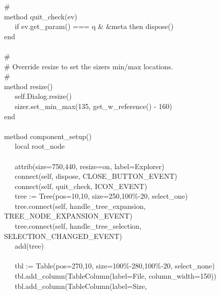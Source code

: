{\>   \# \\
\>   method quit\_check(ev) \\
\>   \ \ \ if ev.get\_param() === {\textquotedbl}q{\textquotedbl} \&
\&meta then dispose() \\
\>   end \\
\ \\
\>   \# \\
\>   \# Override resize to set the sizer{\textquotesingle}s min/max
locations. \\
\>   \# \\
\>   method resize() \\
\>   \ \ \ self.Dialog.resize() \\
\>   \ \ \ sizer.set\_min\_max(135, get\_w\_reference() - 160) \\
\>   end \\
\ \\
\>   method component\_setup() \\
\>   \ \ \ local root\_node \\
\ \\
\>   \ \ \ attrib({\textquotedbl}size=750,440{\textquotedbl},
{\textquotedbl}resize=on{\textquotedbl},
{\textquotedbl}label=Explorer{\textquotedbl}) \\
\>   \ \ \ connect(self, {\textquotedbl}dispose{\textquotedbl},
CLOSE\_BUTTON\_EVENT) \\
\>   \ \ \ connect(self, {\textquotedbl}quit\_check{\textquotedbl},
ICON\_EVENT) \\
\>   \ \ \ tree := Tree({\textquotedbl}pos=10,10{\textquotedbl},
{\textquotedbl}size=250,100\%-20{\textquotedbl},
{\textquotedbl}select\_one{\textquotedbl}) \\
\>   \ \ \ tree.connect(self,
{\textquotedbl}handle\_tree\_expansion{\textquotedbl},
TREE\_NODE\_EXPANSION\_EVENT) \\
\>   \ \ \ tree.connect(self,
{\textquotedbl}handle\_tree\_selection{\textquotedbl},
SELECTION\_CHANGED\_EVENT) \\
\>   \ \ \ add(tree) \\
\ \\
\>   \ \ \ tbl := Table({\textquotedbl}pos=270,10{\textquotedbl},
{\textquotedbl}size=100\%-280,100\%-20{\textquotedbl},
{\textquotedbl}select\_none{\textquotedbl}) \\
\>   \ \ \ tbl.add\_column(TableColumn({\textquotedbl}label=File{\textquotedbl},
{\textquotedbl}column\_width=150{\textquotedbl})) \\
\>   \ \ \ tbl.add\_column(TableColumn({\textquotedbl}label=Size{\textquotedbl},
}
